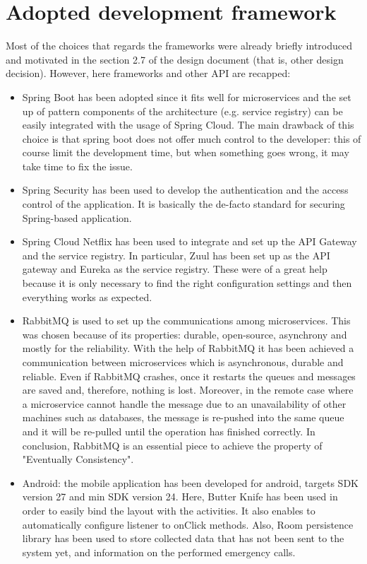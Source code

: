 \section{Adopted development framework}
Most of the choices that regards the frameworks were already briefly introduced and motivated in the
section 2.7 of the design document (that is, other design decision). 
However, here frameworks and other API are recapped:

\begin{itemize}

\item Spring\cite{spring} Boot has been adopted since it fits well for microservices and the set up of pattern components
of the architecture (e.g. service registry) can be easily integrated with the usage of Spring Cloud.
The main drawback of this choice is that spring boot does not offer much control to the developer: this of
course limit the development time, but when something goes wrong, it may take time to fix the issue.

\item Spring Security has been used to develop the authentication and the access control of the application.
It is basically the de-facto standard for securing Spring-based application. 

\item Spring Cloud Netflix has been used to integrate and set up the API Gateway and the service registry.
In particular, Zuul has been set up as the API gateway and Eureka as the service registry. 
These were of a great help because it is only necessary to find the right configuration settings and then everything works as expected.

\item RabbitMQ\cite{rabbitMQ} is used to set up the communications among microservices. This was chosen because of its properties: durable, 
open-source, asynchrony and mostly for the reliability. With the help of RabbitMQ it has been achieved a communication 
between microservices which is asynchronous, durable and reliable. Even if RabbitMQ crashes, once it restarts the queues 
and messages are saved and, therefore, nothing is lost. Moreover, in the remote case where a microservice cannot handle 
the message due to an unavailability of other machines such as databases, the message is re-pushed into the same queue and it 
will be re-pulled until the operation has finished correctly. In conclusion, RabbitMQ is an essential piece to achieve the property 
of "Eventually Consistency".

\item Android: the mobile application has been developed for android, targets SDK version 27 and min SDK version 24. Here, Butter Knife has been used in order to easily bind the layout with the activities. It also enables to automatically configure listener to onClick methods. Also, Room persistence library has been used to store
collected data that has not been sent to the system yet, and information on the performed emergency calls.

\end{itemize}


